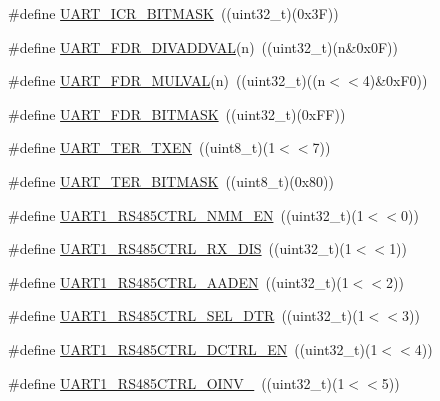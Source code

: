 \begin{DoxyCompactItemize}
\item 
\#define \hyperlink{group___u_a_r_t___private___macros_ga822d618fad4a8a146fd8113f827b5d09}{\-U\-A\-R\-T\-\_\-\-I\-C\-R\-\_\-\-B\-I\-T\-M\-A\-S\-K}~((uint32\-\_\-t)(0x3\-F))
\item 
\#define \hyperlink{group___u_a_r_t___private___macros_ga08ae53568f606c894a5ffd764cef6171}{\-U\-A\-R\-T\-\_\-\-F\-D\-R\-\_\-\-D\-I\-V\-A\-D\-D\-V\-A\-L}(n)~((uint32\-\_\-t)(n\&0x0\-F))
\item 
\#define \hyperlink{group___u_a_r_t___private___macros_ga728a262cba31ffd0d7b4fb172f6dead7}{\-U\-A\-R\-T\-\_\-\-F\-D\-R\-\_\-\-M\-U\-L\-V\-A\-L}(n)~((uint32\-\_\-t)((n$<$$<$4)\&0x\-F0))
\item 
\#define \hyperlink{group___u_a_r_t___private___macros_ga61a8f74c3fc22574793c6218b90fec50}{\-U\-A\-R\-T\-\_\-\-F\-D\-R\-\_\-\-B\-I\-T\-M\-A\-S\-K}~((uint32\-\_\-t)(0x\-F\-F))
\item 
\#define \hyperlink{group___u_a_r_t___private___macros_gaa6e9b1099b787bb65c64d2e07d2fc3cf}{\-U\-A\-R\-T\-\_\-\-T\-E\-R\-\_\-\-T\-X\-E\-N}~((uint8\-\_\-t)(1$<$$<$7))
\item 
\#define \hyperlink{group___u_a_r_t___private___macros_ga65bbbe4fecd3da46942b07267bf5cd32}{\-U\-A\-R\-T\-\_\-\-T\-E\-R\-\_\-\-B\-I\-T\-M\-A\-S\-K}~((uint8\-\_\-t)(0x80))
\item 
\#define \hyperlink{group___u_a_r_t___private___macros_ga17e0186d392ae4cab45b95b94b325af9}{\-U\-A\-R\-T1\-\_\-\-R\-S485\-C\-T\-R\-L\-\_\-\-N\-M\-M\-\_\-\-E\-N}~((uint32\-\_\-t)(1$<$$<$0))
\item 
\#define \hyperlink{group___u_a_r_t___private___macros_gad46c85dd9ed07459a63a886052e53404}{\-U\-A\-R\-T1\-\_\-\-R\-S485\-C\-T\-R\-L\-\_\-\-R\-X\-\_\-\-D\-I\-S}~((uint32\-\_\-t)(1$<$$<$1))
\item 
\#define \hyperlink{group___u_a_r_t___private___macros_gacf6b20c310ad50b23669afbc56f0f005}{\-U\-A\-R\-T1\-\_\-\-R\-S485\-C\-T\-R\-L\-\_\-\-A\-A\-D\-E\-N}~((uint32\-\_\-t)(1$<$$<$2))
\item 
\#define \hyperlink{group___u_a_r_t___private___macros_gacb179ac97fb8aacbea2cf116bc671477}{\-U\-A\-R\-T1\-\_\-\-R\-S485\-C\-T\-R\-L\-\_\-\-S\-E\-L\-\_\-\-D\-T\-R}~((uint32\-\_\-t)(1$<$$<$3))
\item 
\#define \hyperlink{group___u_a_r_t___private___macros_ga4fc9e8ce0ea18bc5ae717d3d00ec02eb}{\-U\-A\-R\-T1\-\_\-\-R\-S485\-C\-T\-R\-L\-\_\-\-D\-C\-T\-R\-L\-\_\-\-E\-N}~((uint32\-\_\-t)(1$<$$<$4))
\item 
\#define \hyperlink{group___u_a_r_t___private___macros_ga576582c10c8fc016f90b548a45e565a7}{\-U\-A\-R\-T1\-\_\-\-R\-S485\-C\-T\-R\-L\-\_\-\-O\-I\-N\-V\-\_}~((uint32\-\_\-t)(1$<$$<$5))

\end{DoxyCompactItemize}
